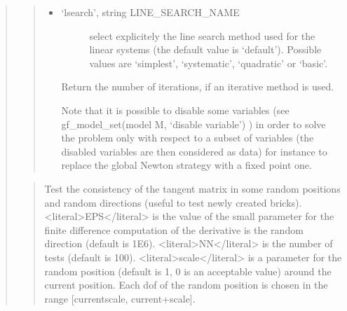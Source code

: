\documentclass[a4paper,11pt,english]{sphinxmanual}
\begin{document}
\begin{quote}
\begin{quote}
\begin{itemize}
\item {} \begin{description}
\item[{‘lsearch’, string LINE\_SEARCH\_NAME}] \leavevmode
\sphinxAtStartPar
select explicitely the line search method used for the linear systems (the
default value is ‘default’).
Possible values are ‘simplest’, ‘systematic’, ‘quadratic’ or ‘basic’.

\end{description}

\sphinxAtStartPar
Return the number of iterations, if an iterative method is used.

\sphinxAtStartPar
Note that it is possible to disable some variables
(see gf\_model\_set(model M, ‘disable variable’) ) in order to
solve the problem only with respect to a subset of variables (the
disabled variables are then considered as data) for instance to
replace the global Newton strategy with a fixed point one.

\end{itemize}
\end{quote}

\sphinxAtStartPar
{}
\begin{quote}

\sphinxAtStartPar
Test the consistency of the tangent matrix in some random positions
and random directions (useful to test newly created bricks).
\textless{}literal\textgreater{}EPS\textless{}/literal\textgreater{} is the value of the small parameter for the finite difference
computation of the derivative is the random direction (default is 1E\sphinxhyphen{}6).
\textless{}literal\textgreater{}NN\textless{}/literal\textgreater{} is the number of tests (default is 100). \textless{}literal\textgreater{}scale\textless{}/literal\textgreater{} is a parameter
for the random position (default is 1, 0 is an acceptable value) around
the current position.
Each dof of the random position is chosen in the range
{[}current\sphinxhyphen{}scale, current+scale{]}.
\end{quote}

\sphinxAtStartPar
{}
\begin{quote}


\end{quote}
\end{quote}
\end{document}

